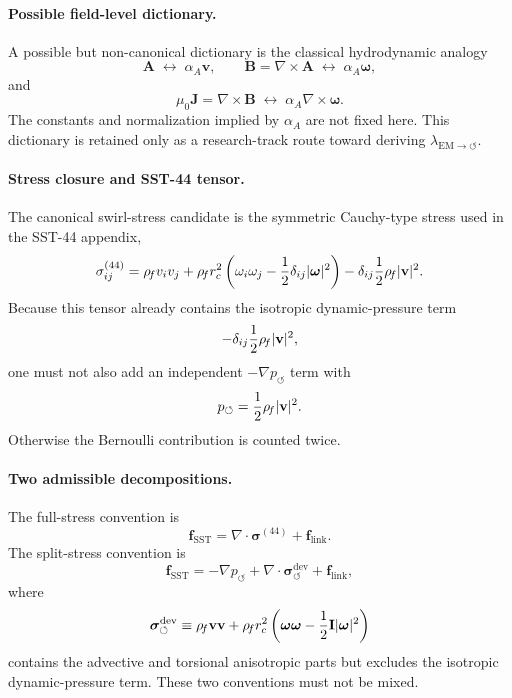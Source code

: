 \paragraph{Possible field-level dictionary.}
A possible but non-canonical dictionary is the classical hydrodynamic analogy
\[
\mathbf A
\;\longleftrightarrow\;
\alpha_A\mathbf v,
\qquad
\mathbf B=\nabla\times\mathbf A
\;\longleftrightarrow\;
\alpha_A\boldsymbol{\omega},
\]
and
\[
\mu_0\mathbf J
=
\nabla\times\mathbf B
\;\longleftrightarrow\;
\alpha_A\nabla\times\boldsymbol{\omega}.
\]
The constants and normalization implied by
\(\alpha_A\) are not fixed here.  This dictionary is retained only as a
research-track route toward deriving
\(\lambda_{\mathrm{EM}\to\circlearrowleft}\).

\paragraph{Stress closure and SST-44 tensor.}
The canonical swirl-stress candidate is the symmetric Cauchy-type stress
used in the SST-44 appendix,
\[
\sigma^{(44)}_{ij}
=
\rho_{\!f} v_i v_j
+
\rho_{\!f} r_c^2
\left(
\omega_i\omega_j-\frac12\delta_{ij}|\boldsymbol{\omega}|^2
\right)
-
\delta_{ij}\frac12\rho_{\!f}|\mathbf v|^2 .
\]
Because this tensor already contains the isotropic dynamic-pressure term
\[
-\delta_{ij}\frac12\rho_{\!f}|\mathbf v|^2,
\]
one must not also add an independent
\(-\nabla p_{\circlearrowleft}\) term with
\[
p_{\circlearrowleft}
=
\frac12\rho_{\!f}|\mathbf v|^2 .
\]
Otherwise the Bernoulli contribution is counted twice.

\paragraph{Two admissible decompositions.}
The full-stress convention is
\[
\boxed{
\mathbf f_{\mathrm{SST}}
=
\nabla\cdot\boldsymbol{\sigma}^{(44)}
+
\mathbf f_{\mathrm{link}} .
}
\]
The split-stress convention is
\[
\boxed{
\mathbf f_{\mathrm{SST}}
=
-\nabla p_{\circlearrowleft}
+
\nabla\cdot\boldsymbol{\sigma}^{\mathrm{dev}}_{\circlearrowleft}
+
\mathbf f_{\mathrm{link}},
}
\]
where
\[
\boldsymbol{\sigma}^{\mathrm{dev}}_{\circlearrowleft}
\equiv
\rho_{\!f}\mathbf v\mathbf v
+
\rho_{\!f}r_c^2
\left(
\boldsymbol{\omega}\boldsymbol{\omega}
-
\frac12\mathbf I|\boldsymbol{\omega}|^2
\right)
\]
contains the advective and torsional anisotropic parts but excludes the
isotropic dynamic-pressure term.  These two conventions must not be mixed.

